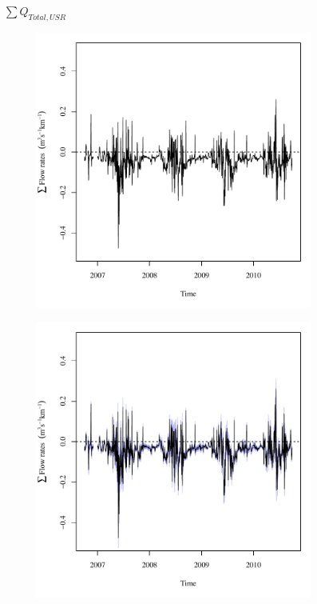 \begin{linenumbers}
\subfiguretop
\begin{landscape}
	\begin{figure}
		\centering
		$ \displaystyle \sum Q_{Total,USR} $
		\begin{subfigure}{0.7\textwidth}
			\centering
			\includegraphics[width=\tableCustomSize]{"Figures/Results_USR/Deterministic/Balance Water - flow"}
		\end{subfigure}%
		\begin{subfigure}{0.7\textwidth}
			\centering
			\includegraphics[width=\tableCustomSize]{"Figures/Results_USR/Stochastic/Balance Water - flow"}

\end{subfigure}
\end{figure}
\end{landscape}
\end{linenumbers}
